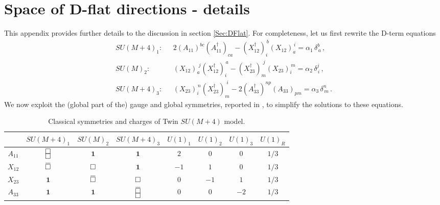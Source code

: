 \documentclass[a4paper,12pt]{article}
\newcommand{\drawsquare}[2]{\hbox{%
\rule{#2pt}{#1pt}\hskip-#2pt%
\rule{#1pt}{#2pt}\hskip-#1pt%
\rule[#1pt]{#1pt}{#2pt}}\rule[#1pt]{#2pt}{#2pt}\hskip-#2pt%
\rule{#2pt}{#1pt}}%
\newcommand{\fund}{~\raisebox{-.5pt}{\drawsquare{6.5}{0.4}}~}
\newcommand{\antifund}{~\overline{\raisebox{-.5pt}{\drawsquare{6.5}{0.4}}}~}
\newcommand{\asymm}{~\raisebox{-3.5pt}{\drawsquare{6.5}{0.4}}\hskip-6.9pt%
        \raisebox{3pt}{\drawsquare{6.5}{0.4}}~}%
\newcommand{\antiasymm}{~\overline{\raisebox{-3.5pt}{\drawsquare{6.5}{0.4}}\hskip-6.9pt%
        \raisebox{3pt}{\drawsquare{6.5}{0.4}}}~}%
\begin{document}
{%
\appendix

\section{Space of D-flat directions - details}
\label{section_low_E_theory_generic_vevs}


This appendix provides further details to the discussion in section \ref{Sec:DFlat}. For completeness, let us first rewrite the D-term equations
	\begin{align}
SU(M+4)_1  :  \ \ \ & 2(A_{11})^{bc}(A_{11}^\dagger)_{ca} -  (X_{12}^\dagger)^{\, b}_{i}(X_{12})^{\, i}_{ a} =   \alpha_1  \, \delta^b_{\, a} \, , \label{EqA:Dterm1} \\
SU(M)_2	 :  \ \ \ &  (X_{12})^{\,\, j}_{ a}(X_{12}^\dagger)^{\, a}_{i} - (X_{23}^\dagger)^{\,\, j}_{m}(X_{23})^{\, m}_{ i}  =  \alpha_2  \, \delta^j_{\, i} \, , \label{EqA:Dterm2} \\
SU(M+4)_3 : \ \ \ & (X_{23})^{\, n}_{i}(X_{23}^\dagger)^{\,\, i}_{ m} - 2(A_{33}^\dagger)^{np}(A_{33})_{pm}  =  \alpha_3  \, \delta^n_{\, m} \, . \label{EqA:Dterm3}
	\end{align}
We now exploit the (global part of the) gauge and global symmetries, reported in , to simplify the solutions to these equations. 
\begin{table}
		\centering
		\begin{tabular}{c|ccc|cccc}
			\toprule
			& $SU(M+4)_1$  & $SU(M)_2$ & $SU(M+4)_3$ & $U(1)_1$ &  $U(1)_2$ & $U(1)_3$ & $U(1)_R$ \\
			\midrule
			$A_{11}$ &  $\asymm$ & $\mathbf{1}$ & $\mathbf{1}$ & $2$ & $0$ & $0$ & $1/3$ \\
			$X_{12}$ &$\antifund$ &$\fund$ & $\mathbf{1}$ & $-1$ & $1$ & $0$ & $1/3$ \\
			$X_{23}$ & $\mathbf{1}$ &$\antifund$ &$\fund$ & $0$ & $-1$ & $1$ & $1/3$ \\
			$A_{33}$ &  $\mathbf{1}$ &   $\mathbf{1}$ &$\antiasymm$ & $0$ & $0$ & $-2$ & $1/3$ \\
			\bottomrule
		\end{tabular}
		\caption{Classical symmetries and charges of Twin $SU(M+4)$ model.}
		\label{Tab:ClassicalCharges}
\end{table}
	
}
\end{document}
